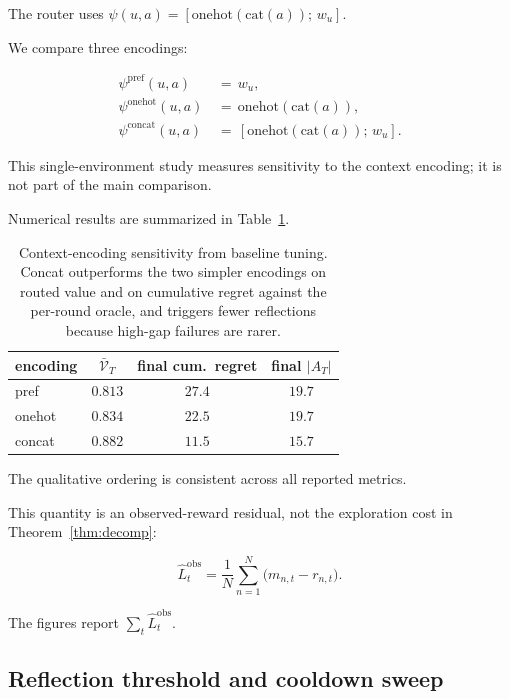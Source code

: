 \documentclass{article} %
\begin{document}
\label{app:ctx-type}

The router uses $\psi(u,a)=[\mathrm{onehot}(\mathrm{cat}(a));\,w_u]$.

We compare three encodings:

\begin{align}
\label{eq:app-ctx-pref}
\psi^{\mathrm{pref}}(u,a) &\,=\, w_u,\\
\label{eq:app-ctx-onehot}
\psi^{\mathrm{onehot}}(u,a) &\,=\, \mathrm{onehot}(\mathrm{cat}(a)),\\
\label{eq:app-ctx-concat}
\psi^{\mathrm{concat}}(u,a) &\,=\, [\mathrm{onehot}(\mathrm{cat}(a));\,w_u].
\end{align}

This single-environment study measures sensitivity to the context encoding; it is not part of the main comparison.

Numerical results are summarized in Table~\ref{tab:app-ctx-type}.

\begin{table}[h]
\centering
\small
\begin{tabular}{lccc}
\toprule
encoding & $\bar{\mathcal{V}}_T$ & final cum.\ regret & final $|A_T|$ \\
\midrule
pref     & $0.813$ & $27.4$ & $19.7$ \\
onehot   & $0.834$ & $22.5$ & $19.7$ \\
concat   & $0.882$ & $11.5$ & $15.7$ \\
\bottomrule
\end{tabular}
\caption{Context-encoding sensitivity from baseline tuning. Concat outperforms the two simpler encodings on routed value and on cumulative regret against the per-round oracle, and triggers fewer reflections because high-gap failures are rarer.}
\label{tab:app-ctx-type}
\end{table}

The qualitative ordering is consistent across all reported metrics.

This quantity is an observed-reward residual, not the exploration cost in
Theorem~\ref{thm:decomp}:

\begin{equation}
\label{eq:app-emp-LT-recap}
\hat L_t^{\mathrm{obs}}
=
\frac{1}{N}\sum_{n=1}^{N}\big(m_{n,t}-r_{n,t}\big).
\end{equation}

The figures report \(\sum_t\hat L_t^{\mathrm{obs}}\).

\subsection{Reflection threshold and cooldown sweep}
\end{document}
